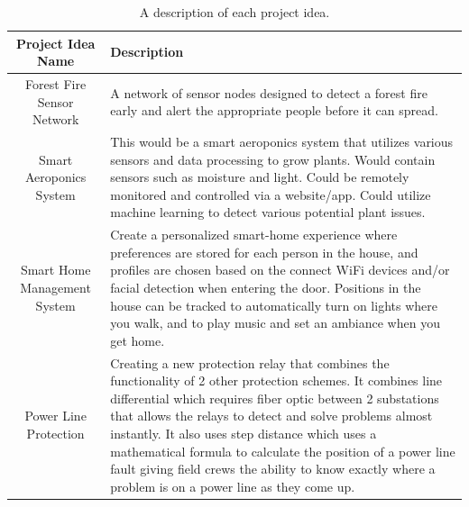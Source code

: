 \documentclass{article}
\begin{document}
\begin{table}[H]
    \centering
    \begin{tabularx}{\linewidth}{|c|X|}
        \hline
        Project Idea Name & Description \\
        \hline
        Forest Fire Sensor Network &
        A network of sensor nodes designed to detect a forest fire early and alert the appropriate people before it can spread. \\\hline
        
        Smart Aeroponics System &
        This would be a smart aeroponics system that utilizes various sensors and data processing to grow plants. Would contain sensors such as moisture and light. Could be remotely monitored and controlled via a website/app. Could utilize machine learning to detect various potential plant issues. \\\hline
        
        Smart Home Management System 
        & Create a personalized smart-home experience where preferences are stored for each person in the house, and profiles are chosen based on the connect WiFi devices and/or facial detection when entering the door. Positions in the house can be tracked to automatically turn on lights where you walk, and to play music and set an ambiance when you get home.
        \\
        
        \hline
        Power Line Protection &
        Creating a new protection relay that combines the functionality of 2 other protection schemes. It combines line differential which requires fiber optic between 2 substations that allows the relays to detect and solve problems almost instantly. It also uses step distance which uses a mathematical formula to calculate the position of a power line fault giving field crews the ability to know exactly where a problem is on a power line as they come up. \\\hline
    
    \end{tabularx}
    \caption{A description of each project idea.}
\end{table}
\end{document}
